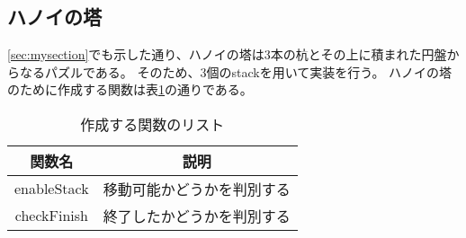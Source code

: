 \documentclass[dvipdfmx]{jsarticle}
\begin{document}
\subsection{ハノイの塔}
\ref{sec:mysection}でも示した通り、ハノイの塔は3本の杭とその上に積まれた円盤からなるパズルである。
そのため、3個のstackを用いて実装を行う。
ハノイの塔のために作成する関数は表\ref{tab:hanoi_functions}の通りである。
\begin{table}[ht]
  \centering
  \begin{tabular}{|c|c|}
    \hline
    \textbf{関数名} & \textbf{説明}   \\
    \hline
    enableStack  & 移動可能かどうかを判別する \\
    \hline
    checkFinish  & 終了したかどうかを判別する \\
    \hline
  \end{tabular}
  \caption{作成する関数のリスト}
  \label{tab:hanoi_functions}
\end{table}
\end{document}
